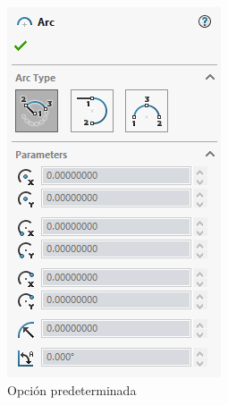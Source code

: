 \documentclass[12pt,letterpaper,final]{report}
\begin{document}
\begin{figure}[H]
	\centering
	\begin{subfigure}[b]{0.35\textwidth}
		\includegraphics[width=\textwidth]{Imagenes/solidworks_ciclarcona01}
		\caption{Opción predeterminada}
		\label{fig:solidworksciclarcona01}
	\end{subfigure}
	\begin{subfigure}[b]{0.35\textwidth}

\end{subfigure}
\end{figure}
\end{document}
